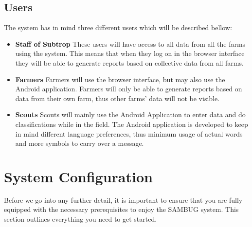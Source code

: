 \documentclass[11pt,a4paper,titlepage]{article}
\begin{document}
\subsection{Users}
The system has in mind three different users which will be described bellow:
	\begin{itemize}
		\item \textbf{Staff of Subtrop} These users will have access to all data from all the farms using the system. This means that when they log on in the browser interface they will be able to generate reports based on collective data from all farms.
		\item \textbf{Farmers} Farmers will use the browser interface, but may also use the Android application. Farmers will only be able to generate reports based on data from their own farm, thus other farms' data will not be visible. 
		\item \textbf{Scouts} Scouts will mainly use the Android Application to enter data and do classifications while in the field. The Android application is developed to keep in mind different language preferences, thus minimum usage of actual words and more symbols to carry over a message.
	\end{itemize}



\section{System Configuration}
Before we go into any further detail, it is important to ensure that you are fully equipped with the necessary prerequisites to enjoy the SAMBUG system. This section outlines everything you need to get started.
\end{document}
